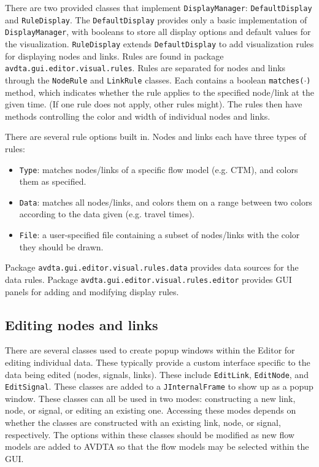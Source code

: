 There are two provided classes that implement \texttt{DisplayManager}: \texttt{DefaultDisplay} and \texttt{RuleDisplay}. The \texttt{DefaultDisplay} provides only a basic implementation of \texttt{DisplayManager}, with booleans to store all display options and default values for the visualization. \texttt{RuleDisplay} extends \texttt{DefaultDisplay} to add visualization rules for displaying nodes and links. Rules are found in package \texttt{avdta.gui.editor.visual.rules}. Rules are separated for nodes and links through the \texttt{NodeRule} and \texttt{LinkRule} classes. Each contains a boolean \texttt{matches($\cdot$)} method, which indicates whether the rule applies to the specified node/link at the given time. (If one rule does not apply, other rules might). The rules then have methods controlling the color and width of individual nodes and links. 

There are several rule options built in. Nodes and links each have three types of rules:
\begin{itemize}
	\item \texttt{Type}: matches nodes/links of a specific flow model (e.g. CTM), and colors them as specified.
	\item \texttt{Data}: matches all nodes/links, and colors them on a range between two colors according to the data given (e.g. travel times).
	\item \texttt{File}: a user-specified file containing a subset of nodes/links with the color they should be drawn.
\end{itemize}
%
Package \texttt{avdta.gui.editor.visual.rules.data} provides data sources for the data rules.  Package \texttt{avdta.gui.editor.visual.rules.editor} provides GUI panels for adding and modifying display rules.


\subsection{Editing nodes and links}
\label{api:editor:edit}

There are several classes used to create popup windows within the Editor for editing individual data. These typically provide a custom interface specific to the data being edited (nodes, signals, links). These include \texttt{EditLink}, \texttt{EditNode}, and \texttt{EditSignal}. These classes are added to a \texttt{JInternalFrame} to show up as a popup window. These classes can all be used in two modes: constructing a new link, node, or signal, or editing an existing one. Accessing these modes depends on whether the classes are constructed with an existing link, node, or signal, respectively. The options within these classes should be modified as new flow models are added to AVDTA so that the flow models may be selected within the GUI.






